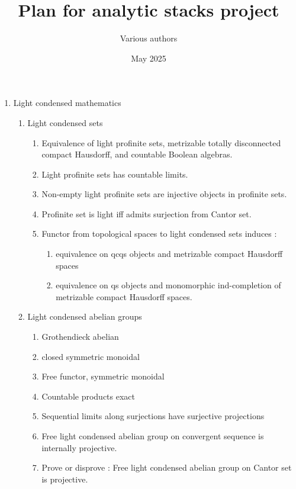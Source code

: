 \documentclass{article}
\title{Plan for analytic stacks project}
\author{Various authors}
\date{May 2025}
\begin{document}
\maketitle

\begin{enumerate}
    \item Light condensed mathematics
    \begin{enumerate}
        \item Light condensed sets
        \begin{enumerate}
          \item Equivalence of light profinite sets,
          metrizable totally disconnected compact Hausdorff,
          and countable Boolean algebras.
          \item Light profinite sets has countable limits.
          \item Non-empty light profinite sets are injective objects in profinite sets.
          \item Profinite set is light iff admits surjection from Cantor set.
          \item Functor from topological spaces to light condensed sets induces : 
          \begin{enumerate}
            \item equivalence on qcqs objects and metrizable compact Hausdorff spaces
            \item equivalence on qs objects and monomorphic ind-completion of
            metrizable compact Hausdorff spaces.
          \end{enumerate}
        \end{enumerate}
        \item Light condensed abelian groups
        \begin{enumerate}
          \item Grothendieck abelian
          \item closed symmetric monoidal
          \item Free functor, symmetric monoidal
          \item Countable products exact
          \item Sequential limits along surjections have surjective projections
          \item Free light condensed abelian group on convergent sequence
          is internally projective.
          \item Prove or disprove : Free light condensed abelian group
          on Cantor set is projective.

\end{enumerate}
\end{enumerate}
\end{enumerate}
\end{document}
